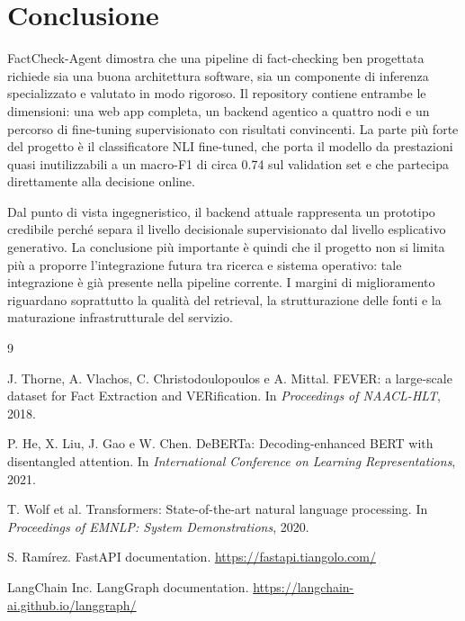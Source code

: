 \documentclass[10pt,a4paper]{article}
\begin{document}
\section{Conclusione}

FactCheck-Agent dimostra che una pipeline di fact-checking ben progettata richiede sia una buona architettura software, sia un componente di inferenza specializzato e valutato in modo rigoroso. Il repository contiene entrambe le dimensioni: una web app completa, un backend agentico a quattro nodi e un percorso di fine-tuning supervisionato con risultati convincenti. La parte più forte del progetto è il classificatore NLI fine-tuned, che porta il modello da prestazioni quasi inutilizzabili a un macro-F1 di circa 0.74 sul validation set e che partecipa direttamente alla decisione online.

Dal punto di vista ingegneristico, il backend attuale rappresenta un prototipo credibile perché separa il livello decisionale supervisionato dal livello esplicativo generativo. La conclusione più importante è quindi che il progetto non si limita più a proporre l'integrazione futura tra ricerca e sistema operativo: tale integrazione è già presente nella pipeline corrente. I margini di miglioramento riguardano soprattutto la qualità del retrieval, la strutturazione delle fonti e la maturazione infrastrutturale del servizio.

\begin{thebibliography}{9}

J. Thorne, A. Vlachos, C. Christodoulopoulos e A. Mittal.
\newblock FEVER: a large-scale dataset for Fact Extraction and VERification.
\newblock In \textit{Proceedings of NAACL-HLT}, 2018.

P. He, X. Liu, J. Gao e W. Chen.
\newblock DeBERTa: Decoding-enhanced BERT with disentangled attention.
\newblock In \textit{International Conference on Learning Representations}, 2021.

T. Wolf et al.
\newblock Transformers: State-of-the-art natural language processing.
\newblock In \textit{Proceedings of EMNLP: System Demonstrations}, 2020.

S. Ramírez.
\newblock FastAPI documentation.
\newblock \url{https://fastapi.tiangolo.com/}

LangChain Inc.
\newblock LangGraph documentation.
\newblock \url{https://langchain-ai.github.io/langgraph/}

\end{thebibliography}
\end{document}

